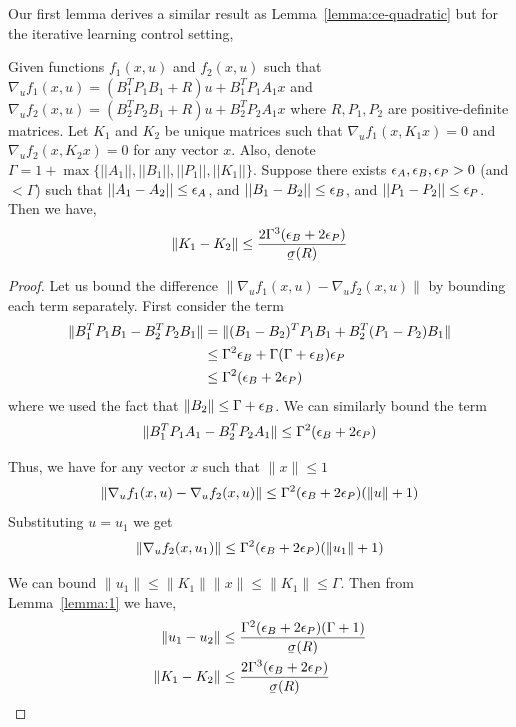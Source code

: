 Our first lemma derives a similar result as
Lemma~\ref{lemma:ce-quadratic} but for the iterative learning control
setting,
\begin{lemma}
  \label{lemma:ilc-quadratic}
  Given functions $f_{1}(x, u)$ and $f_{2}(x, u)$ such that
  $\nabla_{u} f_{1}(x, u) = (B_{1}^{T}P_{1}B_{1} + R)u + B_{1}^{T}P_{1}A_{1}x$
  and
  $\nabla_{u} f_{2}(x, u) = (B_{2}^{T}P_{2}B_{1} + R)u + B_{2}^{T}P_{2}A_{1}x$
  where $R, P_{1}, P_{2}$ are positive-definite matrices. Let $K_{1}$ and
  $K_{2}$ be unique matrices such that $\nabla_{u} f_{1}(x, K_{1}x) = 0$ and
  $\nabla_{u} f_{2}(x, K_{2}x) = 0$ for any
  vector $x$. Also,
  denote $\Gamma = 1 + \max\{||A_1||, ||B_1||, ||P_1||,
  ||K_1||\}$. Suppose there exists $\epsilon_A, \epsilon_B, \epsilon_P > 0$ (and $<\Gamma$) such that
  $||A_1 - A_2|| \leq \epsilon_A$, and $||B_1 - B_2|| \leq
  \epsilon_B$, and $||P_1 - P_2|| \leq \epsilon_P$. Then we have,
  \begin{equation}
    \label{eq:81}
    \|K_{1} - K_{2}\| \leq \frac{2\Gamma^3(\epsB + 2\epsP)}{\ubar{\sigma}(R)}
  \end{equation}
\end{lemma}
\begin{proof}
  Let us bound the difference $\|\nabla_{u} f_{1}(x,u) - \nabla_{u} f_{2}(x, u)\|$
  by bounding each term separately. First consider the term
  \begin{align*}
    \|B_{1}^{T}P_{1}B_{1} - B_{2}^{T}P_{2}B_{1}\| &= \|(B_{1} - B_{2})^{T}P_{1}B_{1} + B_{2}^{T}(P_{1} - P_{2})B_{1}\| \\
                                                  &\leq \Gamma^{2}\epsilon_B + \Gamma(\Gamma + \epsilon_B)\epsilon_P \\
    &\leq \Gamma^2(\epsilon_B + 2\epsilon_P)
  \end{align*}
  where we used the fact that $\|B_{2}\| \leq \Gamma + \epsilon_B$.
  We can similarly bound the term
  \begin{align*}
    \|B_{1}^{T}P_{1}A_{1} - B_{2}^{T}P_{2}A_{1}\| \leq \Gamma^{2}(\epsilon_B + 2\epsilon_P)
  \end{align*}

  Thus, we have for any vector $x$ such that $\|x\| \leq 1$
  \begin{align*}
    \|\nabla_{u} f_{1}(x,u) - \nabla_{u} f_{2}(x, u)\| \leq \Gamma^{2}(\epsilon_B + 2\epsilon_P)(\|u\| + 1)
  \end{align*}
  Substituting $u=u_{1}$ we get
  \begin{align*}
    \|\nabla_{u} f_{2}(x, u_{1})\| \leq \Gamma^{2}(\epsilon_B + 2\epsilon_P)(\|u_{1}\| + 1)
  \end{align*}

  We can bound $\|u_{1}\| \leq \|K_{1}\|\|x\| \leq \|K_{1}\| \leq \Gamma$. Then
  from Lemma~\ref{lemma:1} we have,
  \begin{align*}
    \|u_{1} - u_{2}\| &\leq \frac{\Gamma^{2}(\epsB + 2\epsP)(\Gamma+1)}{\ubar{\sigma}(R)} \\
    \|K_{1} - K_{2}\| &\leq \frac{2\Gamma^{3}(\epsB + 2\epsP)}{\ubar{\sigma}(R)}
  \end{align*}
\end{proof}

